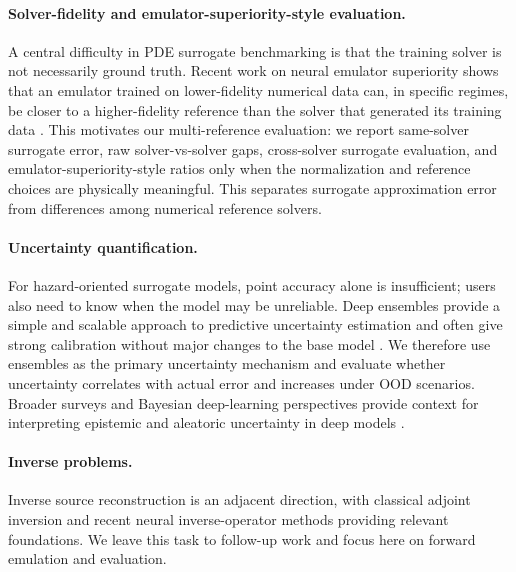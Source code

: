 \paragraph{Solver-fidelity and emulator-superiority-style evaluation.}
A central difficulty in PDE surrogate benchmarking is that the training solver is not necessarily ground truth. Recent work on neural emulator superiority shows that an emulator trained on lower-fidelity numerical data can, in specific regimes, be closer to a higher-fidelity reference than the solver that generated its training data \citep{koehler2026emulator}. This motivates our multi-reference evaluation: we report same-solver surrogate error, raw solver-vs-solver gaps, cross-solver surrogate evaluation, and emulator-superiority-style ratios only when the normalization and reference choices are physically meaningful. This separates surrogate approximation error from differences among numerical reference solvers.

\paragraph{Uncertainty quantification.}
For hazard-oriented surrogate models, point accuracy alone is insufficient; users also need to know when the model may be unreliable. Deep ensembles provide a simple and scalable approach to predictive uncertainty estimation and often give strong calibration without major changes to the base model \citep{lakshminarayanan2017deepensembles}. We therefore use ensembles as the primary uncertainty mechanism and evaluate whether uncertainty correlates with actual error and increases under OOD scenarios. Broader surveys and Bayesian deep-learning perspectives provide context for interpreting epistemic and aleatoric uncertainty in deep models \citep{he2023uqsurvey,wilson2020bayesian}.

\paragraph{Inverse problems.}
Inverse source reconstruction is an adjacent direction, with classical adjoint inversion and recent neural inverse-operator methods providing relevant foundations. We leave this task to follow-up work and focus here on forward emulation and evaluation.
